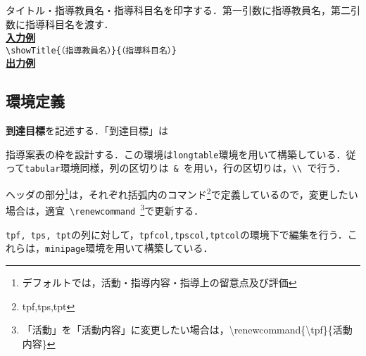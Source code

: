 \documentclass[paper=a4,fontsize=10.5pt]{jlreq}
\begin{document}
\noindent\ovalbox{\large \verb|\showTitle|}\par
タイトル・指導教員名・指導科目名を印字する．第一引数に指導教員名，第二引数に指導科目名を渡す．\\
\underline{\textbf{入力例}}\\
\verb|\showTitle{（指導教員名）}{（指導科目名）}|\\
\noindent\underline{\textbf{出力例}}
\begin{framed}
\end{framed}
\begin{leftbar}
    \section*{環境定義}
\end{leftbar}
\noindent{}\par
\textbf{到達目標}を記述する．「到達目標」は\\
\noindent{}\par
指導案表の枠を設計する．この環境は\verb|longtable|環境を用いて構築している．従って\verb|tabular|環境同様，列の区切りは\verb| & |を用い，行の区切りは，\verb|\\ |で行う．\par
ヘッダの部分\footnote{デフォルトでは，活動・指導内容・指導上の留意点及び評価}は，それぞれ括弧内のコマンド\footnote{tpf,tps,tpt}で定義しているので，変更したい場合は，適宜\verb| \renewcommand |\footnote{「活動」を「活動内容」に変更したい場合は，{\ttfamily\textbackslash renewcommand\{\textbackslash tpf\}\{活動内容\}}}で更新する．\vspace{0.5em}\\
\par
\verb|tpf, tps, tpt|の列に対して，\verb|tpfcol,tpscol,tptcol|の環境下で編集を行う．これらは，\verb|minipage|環境を用いて構築している．\par
\renewcommand{\tpf}{活動（tpf）}
\renewcommand{\tps}{指導内容（tps）}
\renewcommand{\tpt}{指導上の留意点及び評価（tpt）}
\end{document}
